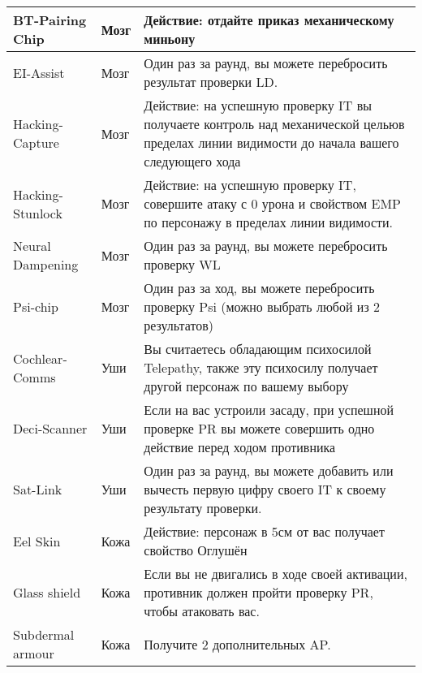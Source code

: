 \begin{table}[h]
\begin{tabularx}{\textwidth}{|l|l|X|}
    BT-Pairing Chip    & Мозг       & Действие: отдайте приказ механическому миньону                                                                                                   \\ \hline
    EI-Assist          & Мозг       & Один раз за раунд, вы можете перебросить результат проверки LD.                                                                                  \\ \hline
    Hacking-Capture    & Мозг       & Действие: на успешную проверку IT вы получаете контроль над механической цельюв пределах линии видимости до начала вашего следующего хода        \\ \hline
    Hacking-Stunlock   & Мозг       & Действие: на успешную проверку IT, совершите атаку с 0 урона и свойством EMP по персонажу в пределах линии видимости.                            \\ \hline
    Neural Dampening   & Мозг       & Один раз за раунд, вы можете перебросить проверку WL                                                                                             \\ \hline
    Psi-chip           & Мозг       & Один раз за ход, вы можете перебросить проверку Psi (можно выбрать любой из 2 результатов)                                                       \\ \hline
    Cochlear-Comms     & Уши        & Вы считаетесь обладающим психосилой Telepathy, также эту психосилу получает другой персонаж по вашему выбору                                     \\ \hline
    Deci-Scanner       & Уши        & Если на вас устроили засаду, при успешной проверке PR вы можете совершить одно действие перед ходом противника                                   \\ \hline
    Sat-Link           & Уши        & Один раз за раунд, вы можете добавить или вычесть первую цифру своего IT к своему результату проверки.                                           \\ \hline
    Eel Skin           & Кожа       & Действие: персонаж в 5см от вас получает свойство Оглушён                                                                                        \\ \hline
    Glass shield       & Кожа       & Если вы не двигались в ходе своей активации, противник должен пройти проверку PR, чтобы атаковать вас.                                           \\ \hline
    Subdermal armour   & Кожа       & Получите 2 дополнительных AP.                                                                                                                    \\ \hline

\end{tabularx}
\end{table}
